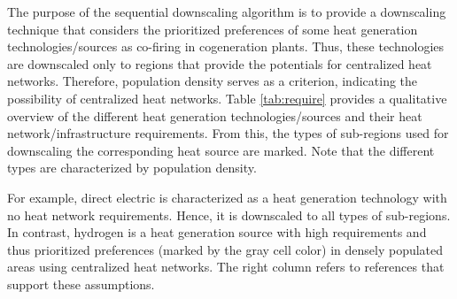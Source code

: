 The purpose of the sequential downscaling algorithm is to provide a downscaling technique that considers the prioritized preferences of some heat generation technologies/sources as co-firing in cogeneration plants. Thus, these technologies are downscaled only to regions that provide the potentials for centralized heat networks. Therefore, population density serves as a criterion, indicating the possibility of centralized heat networks. Table \ref{tab:require} provides a qualitative overview of the different heat generation technologies/sources and their heat network/infrastructure requirements. From this, the types of sub-regions used for downscaling the corresponding heat source are marked. Note that the different types are characterized by population density.
\vspace{0.3cm}
\begin{table}[h]
	\centering
	\setlength{\extrarowheight}{.5em}
	\caption{Qualitative overview for heat generation technologies/sources and their requirments for heat network infrastructure. The prioritized preferences (gray cell color) of heat sources in sub-regions is marked by the gray color.}
	\label{tab:require}
\end{table}

For example, direct electric is characterized as a heat generation technology with no heat network requirements. Hence, it is downscaled to all types of sub-regions. In contrast, hydrogen is a heat generation source with high requirements and thus prioritized preferences (marked by the gray cell color) in densely populated areas using centralized heat networks. The right column refers to references that support these assumptions.\newline

